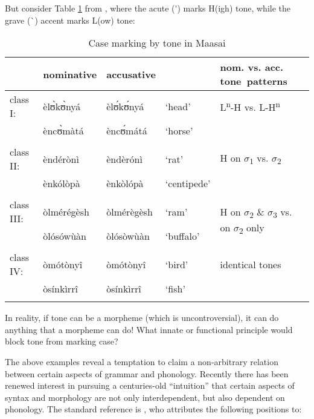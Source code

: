 \documentclass[output=paper]{langsci/langscibook}
\begin{document}
But consider Table \ref{tab:hyman:maasai} from  \citep[177--184]{Tucker1955}, where the acute (\'{}) marks H(igh) tone, while the grave (\`{}) accent marks L(ow) tone:
\begin{table}
\begin{tabularx}{\textwidth}{lXXlX} 
\lsptoprule
& {nominative} & {accusative}   & & {{nom. vs. acc. \newline \mbox{tone patterns}}}\\
\midrule
class I: & èlʊ̀kʊ̀nyá & èlʊ́kʊ́nyá  & ‘head’ & L\textsuperscript{n}{}-H vs. L-H\textsuperscript{n}\\
& èncʊ̀màtá & èncʊ́mátá & ‘horse’ & \\
\\
class II: & èndérònì & èndèrónì & ‘rat’ & H on ${\sigma}$\textsubscript{1} vs. ${\sigma}$\textsubscript{2}\\
& ènkólòpà & ènkòlópà & ‘centipede’ & \\
\\
class III: & òlmérégèsh & òlmérègèsh & ‘ram’ & \multirow{2}{*}{\parbox{3cm}{H on ${\sigma}$\textsubscript{2} \& ${\sigma}$\textsubscript{3} vs. \newline on ${\sigma}$\textsubscript{2} only}}\\
& òlósówùàn & òlósòwùàn & ‘buffalo’ & \\
\\
class IV: & òmótònyî & òmótònyî & ‘bird’ & identical tones\\
& òsínkìrrî & òsínkìrrî & ‘fish’ & \\
\lspbottomrule
\end{tabularx}
\caption{Case marking by tone in Maasai}
\label{tab:hyman:maasai}
\end{table}

In reality, if tone can be a morpheme (which is uncontroversial), it can do anything that a morpheme can do! What innate or functional principle would block tone from marking case? 

 The above examples reveal a temptation to claim a non-arbitrary relation between certain aspects of grammar and phonology. Recently there has been renewed interest in pursuing a centuries-old “intuition” that certain aspects of syntax and morphology are not only interdependent, but also dependent on phonology. The standard reference is \citet{Plank1998}, who attributes the following positions to:
\end{document}
